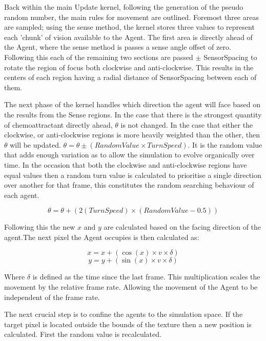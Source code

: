 \documentclass[]{report}
\begin{document}
Back within the main Update kernel, following the generation of the pseudo random number, the main rules for movement are outlined. Foremost three areas are sampled; using the sense method, the kernel stores three values to represent each 'chunk' of vision available to the Agent. The first area is directly ahead of the Agent, where the sense method is passes a sense angle offset of zero. Following this each of the remaining two sections are passed $\pm$ SensorSpacing to rotate the region of focus both clockwise and anti-clockwise. This  results in the centers of each region having a radial distance of SensorSpacing between each of them.

The next phase of the kernel handles which direction the agent will face based on the results from the Sense regions. In the case that there is the strongest quantity of chemoattractant directly ahead, $\theta$ is not changed. In the case that either the clockwise, or anti-clockwise regions is more heavily weighted than the other, then $\theta$ will be updated. $\theta = \theta \pm (RandomValue \times TurnSpeed)$. It is the random value that adds enough variation as to allow the simulation to evolve organically over time. In the occasion that both the clockwise and anti-clockwise regions have equal values then a random turn value is calculated to prioritise a single direction over another for that frame, this constitutes the random searching behaviour of each agent.

\begin{equation}
    \theta = \theta + \left(2(TurnSpeed) \times (RandomValue - 0.5)\right)
\end{equation}
    
Following this the new $x$ and $y$ are calculated based on the facing direction of the agent.The next pixel the Agent occupies is then calculated as:

\begin{equation}
    x = x + \left(\cos{(x)}\times v \times \delta\right)
\end{equation}
\begin{equation}
    y = y + \left(\sin{(x)}\times v\times\delta\right)
\end{equation}

Where $\delta$ is defined as the time since the last frame. This multiplication scales the movement by the relative frame rate. Allowing the movement of the Agent to be independent of the frame rate.

The next crucial step is to confine the agents to the simulation space. If the target pixel is located outside the bounds of the texture then a new position is calculated. First the random value is recalculated.
\end{document}

